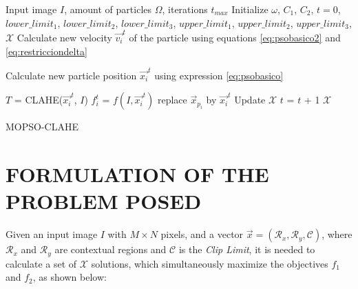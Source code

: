 \documentclass[spanish,twocolumn]{article}
\begin{document}
\begin{algorithm}[H]
    \scriptsize
    \begin{algorithmic}[1]
        \Require Input image $I$, amount of particles $\Omega$, iterations $t_{max}$
        \State Initialize $\omega$, $C_1$, $C_2$, $t=0$, $lower\_limit_1$, $lower\_limit_2$, $lower\_limit_3$, $upper\_limit_1$, $upper\_limit_2$, $upper\_limit_3$, $\mathscr{X}$
                \State Calculate new velocity $\overrightarrow{v_i}^t$ of the particle  using equations \eqref{eq:psobasico2} and \eqref{eq:restricciondelta}


                \State Calculate new particle position $\overrightarrow{x_i}^t$ using expression \eqref{eq:psobasico}

                \State ${T}$ = CLAHE(${\overrightarrow{x_i}^t}$, ${I}$)
                \State ${f^t_i}$ = $f(I, \overrightarrow{x_i}^t)$%
                    \State replace $\overrightarrow{x}_{p_i}$ by $\overrightarrow{x_i}^t$
                \EndIf
                    \State Update $\mathscr{X}$
                \EndIf
                \State $t$ = $t$ + 1
            \EndFor
        \EndWhile
    \Ensure $\mathscr{X}$
    \end{algorithmic}
    \caption{MOPSO-CLAHE}
    \label{alg:pso_clahe}
\end{algorithm}

\section{FORMULATION OF THE PROBLEM POSED}
\label{sec:formulacion}

Given an input image $I$ with $M \times N$ pixels, and a vector $\overrightarrow{x}=(\mathcal{R}_x, \mathcal{R}_y, \mathcal{C})$, where $\mathcal{R}_x$ and $\mathcal{R}_y$ are contextual regions and $\mathscr{C}$ is the {\it Clip Limit}, it is needed to calculate a set of $\mathscr{X}$ solutions, which simultaneously maximize the objectives $f_1$ and $f_2$, as shown below:
\end{document}
